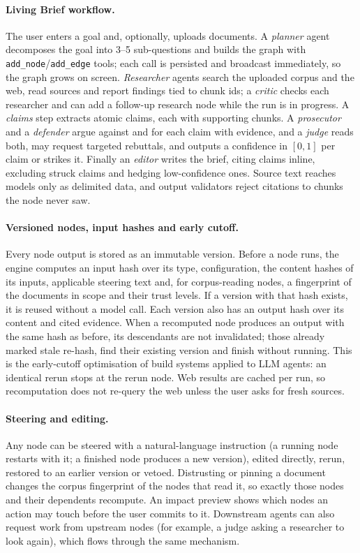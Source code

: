 \documentclass[11pt]{article}
\begin{document}
\paragraph{Living Brief workflow.} The user enters a goal and, optionally, uploads documents. A
\emph{planner} agent decomposes the goal into 3--5 sub-questions and builds the graph with
\texttt{add\_node}/\texttt{add\_edge} tools; each call is persisted and broadcast immediately, so the graph
grows on screen. \emph{Researcher} agents search the uploaded corpus and the web, read sources and report
findings tied to chunk ids; a \emph{critic} checks each researcher and can add a follow-up research node
while the run is in progress. A \emph{claims} step extracts atomic claims, each with supporting chunks. A
\emph{prosecutor} and a \emph{defender} argue against and for each claim with evidence, and a \emph{judge}
reads both, may request targeted rebuttals, and outputs a confidence in $[0,1]$ per claim or strikes it.
Finally an \emph{editor} writes the brief, citing claims inline, excluding struck claims and hedging
low-confidence ones. Source text reaches models only as delimited data, and output validators reject
citations to chunks the node never saw.

\paragraph{Versioned nodes, input hashes and early cutoff.} Every node output is stored as an immutable
version. Before a node runs, the engine computes an input hash over its type, configuration, the content
hashes of its inputs, applicable steering text and, for corpus-reading nodes, a fingerprint of the
documents in scope and their trust levels. If a version with that hash exists, it is reused without a model
call. Each version also has an output hash over its content and cited evidence. When a recomputed node
produces an output with the same hash as before, its descendants are not invalidated; those already marked
stale re-hash, find their existing version and finish without running. This is the early-cutoff
optimisation of build systems \citep{mokhov2018buildsystems} applied to LLM agents: an identical rerun
stops at the rerun node. Web results are cached per run, so recomputation does not re-query the web
unless the user asks for fresh sources.

\paragraph{Steering and editing.} Any node can be steered with a natural-language instruction (a running
node restarts with it; a finished node produces a new version), edited directly, rerun, restored to an
earlier version or vetoed. Distrusting or pinning a document changes the corpus fingerprint of the nodes
that read it, so exactly those nodes and their dependents recompute. An impact preview shows which nodes an
action may touch before the user commits to it. Downstream agents can also request work from upstream
nodes (for example, a judge asking a researcher to look again), which flows through the same mechanism.
\end{document}
